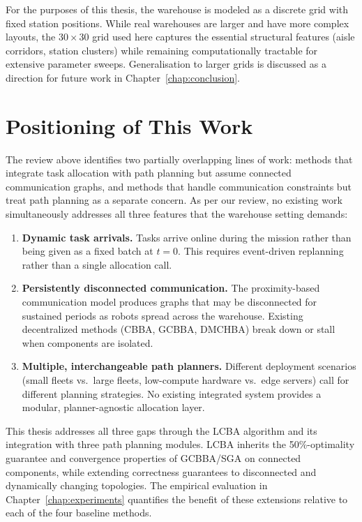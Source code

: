 For the purposes of this thesis, the warehouse is modeled as a discrete grid
with fixed station positions.
While real warehouses are larger and have more complex layouts, the $30 \times
30$ grid used here captures the essential structural features (aisle corridors,
station clusters) while remaining computationally tractable for extensive
parameter sweeps.
Generalisation to larger grids is discussed as a direction for future work in
Chapter~\ref{chap:conclusion}.


\section{Positioning of This Work}
\label{sec:bg_positioning}

The review above identifies two partially overlapping lines of work: methods
that integrate task allocation with path planning but assume connected
communication graphs, and methods that handle communication constraints but
treat path planning as a separate concern.
As per our review, no existing work simultaneously addresses all three features that the warehouse
setting demands:

\begin{enumerate}
  \item \textbf{Dynamic task arrivals.}
        Tasks arrive online during the mission rather than being given as a
        fixed batch at $t = 0$.
        This requires event-driven replanning rather than a single allocation
        call.
  \item \textbf{Persistently disconnected communication.}
        The proximity-based communication model produces graphs that may be
        disconnected for sustained periods as robots spread across the warehouse.
        Existing decentralized methods (CBBA, GCBBA, DMCHBA) break down or
        stall when components are isolated.
  \item \textbf{Multiple, interchangeable path planners.}
        Different deployment scenarios (small fleets vs.\ large fleets,
        low-compute hardware vs.\ edge servers) call for different planning
        strategies.
        No existing integrated system provides a modular, planner-agnostic
        allocation layer.
\end{enumerate}

This thesis addresses all three gaps through the LCBA algorithm and its
integration with three path planning modules.
LCBA inherits the 50\%-optimality guarantee and convergence properties
of GCBBA/SGA on connected components, while extending correctness guarantees to
disconnected and dynamically changing topologies.
The empirical evaluation in Chapter~\ref{chap:experiments} quantifies the
benefit of these extensions relative to each of the four baseline methods.
